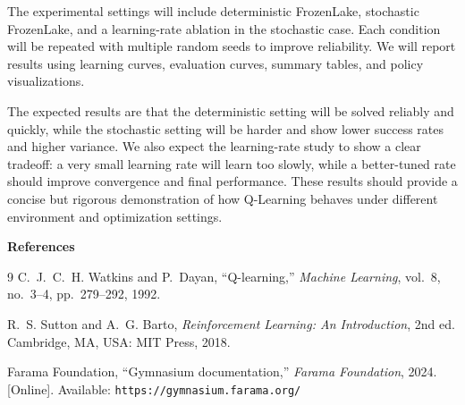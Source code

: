 \documentclass[11pt]{article}
\begin{document}
The experimental settings will include deterministic FrozenLake, stochastic FrozenLake, and a learning-rate ablation in the stochastic case. Each condition will be repeated with multiple random seeds to improve reliability. We will report results using learning curves, evaluation curves, summary tables, and policy visualizations.

The expected results are that the deterministic setting will be solved reliably and quickly, while the stochastic setting will be harder and show lower success rates and higher variance. We also expect the learning-rate study to show a clear tradeoff: a very small learning rate will learn too slowly, while a better-tuned rate should improve convergence and final performance. These results should provide a concise but rigorous demonstration of how Q-Learning behaves under different environment and optimization settings.

\vspace{0.4em}
\textbf{References}
\begin{thebibliography}{9}\setlength{\itemsep}{0.2em}
\bibitem{}
C.~J.~C.~H. Watkins and P.~Dayan,
``Q-learning,''
\emph{Machine Learning},
vol.~8, no.~3--4, pp.~279--292, 1992.

\bibitem{}
R.~S. Sutton and A.~G. Barto,
\emph{Reinforcement Learning: An Introduction},
2nd ed.
Cambridge, MA, USA: MIT Press, 2018.

\bibitem{}
Farama Foundation,
``Gymnasium documentation,''
\emph{Farama Foundation},
2024. [Online]. Available: \texttt{https://gymnasium.farama.org/}
\end{thebibliography}
\end{document}
